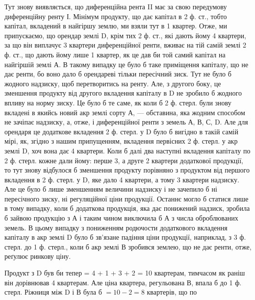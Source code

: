 Тут знову виявляється, що диференційна рента II має за свою передумову
диференційну ренту І. Мінімум продукту, що дає капітал в 2 ф. ст.,
тобто капітал, вкладений в найгіршу землю, ми взяли тут в 1 квартер.
Отже, ми припускаємо, що орендар землі D, крім тих 2 ф. ст., які
дають йому 4 квартери, за що він виплачує 3 квартери диференційної ренти, вживає
на тій самій землі 2 ф. ст., що дають йому лише 1 квартер, як це дав
би той самий капітал на
найгіршій землі А. В такому випадку це було б таке приміщення капіталу,
що не дає ренти, бо воно дало б орендареві тільки пересічний зиск. Тут не
було б жодного надзиску, щоб перетворитись на ренту. Але, з другого боку, це
зменшення продукту від другого вкладення капіталу в D не зробило б жодного
впливу на норму зиску. Це було б те саме, як коли б 2 ф. стерл. були
знову вкладені в якийсь новий акр землі сорту А, — обставина, яка жодним способом
не зачіпає надзиску, а, отже, і диференційної ренти з земель А, В, С, D.
Але для орендаря це додаткове вкладення 2 ф. стерл. у D було б вигідно
в такій самій мірі, як, згідно з нашим припущенням, вкладення первісних
2 ф. стерл. у акр землі D, хоч вона дає 4 квартери. Коли б далі два наступні
вкладення капіталу по 2 ф. стерл. кожне дали йому: перше 3, а друге
2 квартери додаткової продукції, то тут знову відбулося б зменшення продукту
порівняно з продуктом від першого вкладення в 2 ф. стерл. у D, яке
дало 4 квартери, а тому 3 квартери надзиску. Але це було б лише зменшенням
величини надзиску і не зачепило б ні пересічного зиску, ні регуляційної ціни
продукції. Останнє могло б статися лише в тому випадку, коли б додаткова
продукція, яка дає понижений надзиск, зробила б зайвою продукцію з А і таким
чином виключила б А з числа оброблюваних земель. В цьому випадку
з пониженням родючости додаткового вкладення капіталу в акр землі D було б
зв’язане падіння ціни продукції, наприклад, з 3 ф. стерл. до 1 ф. стерл.,
коли б акр землі В зробився землею, що не дає ренти, отже, реґулює ринкову ціну.

Продукт з D був би тепер = 4 + 1 + 3 + 2 = 10 квартерам, тимчасом
як раніш він дорівнював 4 квартерам. Але ціна квартера, регульована В, впала б
до 1 ф. стерл. Ріжниця між D і В була б $= 10 - 2 = 8$ квартерів, що по
\parbreak{}  %
